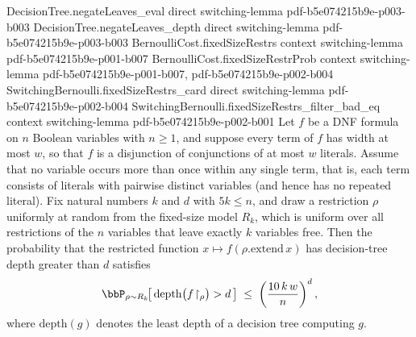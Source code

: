 \begin{lemma}
\proofstep
  {DecisionTree.negateLeaves_eval}
  {direct}
  {switching-lemma}
  {pdf-b5e074215b9e-p003-b003}
\proofstep
  {DecisionTree.negateLeaves_depth}
  {direct}
  {switching-lemma}
  {pdf-b5e074215b9e-p003-b003}
\proofstep
  {BernoulliCost.fixedSizeRestrs}
  {context}
  {switching-lemma}
  {pdf-b5e074215b9e-p001-b007}
\proofstep
  {BernoulliCost.fixedSizeRestrProb}
  {context}
  {switching-lemma}
  {pdf-b5e074215b9e-p001-b007,
    pdf-b5e074215b9e-p002-b004}
\proofstep
  {SwitchingBernoulli.fixedSizeRestrs_card}
  {direct}
  {switching-lemma}
  {pdf-b5e074215b9e-p002-b004}
\proofstep
  {SwitchingBernoulli.fixedSizeRestrs_filter_bad_eq}
  {context}
  {switching-lemma}
  {pdf-b5e074215b9e-p002-b001}
Let $f$ be a DNF formula on $n$ Boolean variables with $n \ge 1$, and suppose every term
of $f$ has width at most $w$, so that $f$ is a disjunction of conjunctions of at most
$w$ literals. Assume that no variable occurs more than once within any single term, that
is, each term consists of literals with pairwise distinct variables (and hence has no
repeated literal). Fix natural numbers $k$ and $d$ with $5k \le n$, and draw a
restriction $\rho$ uniformly at random from the fixed-size model $R_k$, which is uniform
over all restrictions of the $n$ variables that leave exactly $k$ variables free. Then
the probability that the restricted function $x \mapsto f(\rho.\mathrm{extend}\,x)$ has
decision-tree depth greater than $d$ satisfies
\[
\bbP_{\rho \sim R_k}\!\bigl[\, \mathrm{depth}\bigl(f\!\restriction_\rho\bigr) > d
\,\bigr] \;\le\; \left(\frac{10\,k\,w}{n}\right)^{d},
\]
where $\mathrm{depth}(g)$ denotes the least depth of a decision tree computing $g$.
\end{lemma}

